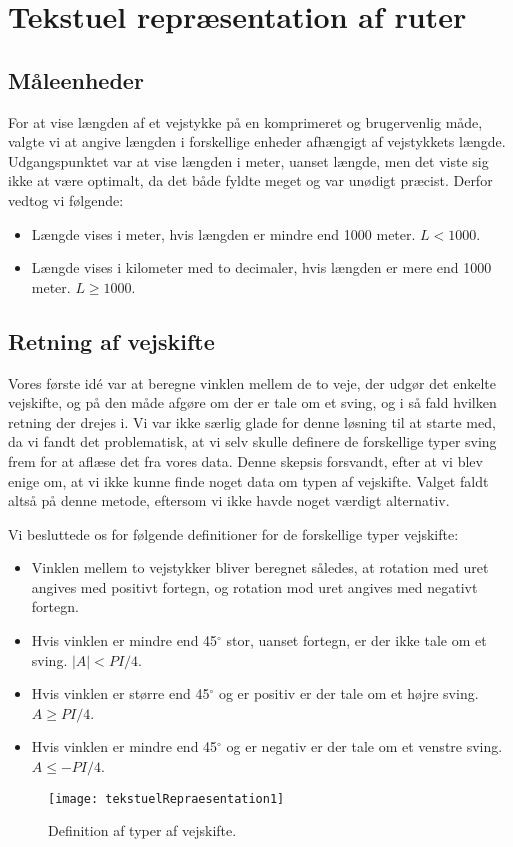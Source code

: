 \section{Tekstuel repræsentation af ruter}
\label{sec:tekstuelRepraesentation}

\subsection{Måleenheder}
\label{sec:maaleenheder}

For at vise længden af et vejstykke på en komprimeret og brugervenlig måde, valgte vi at angive længden i forskellige enheder afhængigt af vejstykkets længde. Udgangspunktet var at vise længden i meter, uanset længde, men det viste sig ikke at være optimalt, da det både fyldte meget og var unødigt præcist. Derfor vedtog vi følgende:

\begin{itemize}
	\item Længde vises i meter, hvis længden er mindre end 1000 meter. $L < 1000$.
	\item Længde vises i kilometer med to decimaler, hvis længden er mere end 1000 meter. $L \geq 1000$.
\end{itemize}

\subsection{Retning af vejskifte}
\label{sec:retning}

Vores første idé var at beregne vinklen mellem de to veje, der udgør det enkelte vejskifte, og på den måde afgøre om der er tale om et sving, og i så fald hvilken retning der drejes i. Vi var ikke særlig glade for denne løsning til at starte med, da vi fandt det problematisk, at vi selv skulle definere de forskellige typer sving frem for at aflæse det fra vores data. Denne skepsis forsvandt, efter at vi blev enige om, at vi ikke kunne finde noget data om typen af vejskifte. Valget faldt altså på denne metode, eftersom vi ikke havde noget værdigt alternativ.

Vi besluttede os for følgende definitioner for de forskellige typer vejskifte:

\begin{itemize}
	\item Vinklen mellem to vejstykker bliver beregnet således, at rotation med uret angives med positivt fortegn, og rotation mod uret angives med negativt fortegn.
	\item Hvis vinklen er mindre end 45$^{\circ}$ stor, uanset fortegn, er der ikke tale om et sving. $|A| < PI / 4$.
	\item Hvis vinklen er større end 45$^{\circ}$ og er positiv er der tale om et højre sving. $A \geq PI / 4$.
	\item Hvis vinklen er mindre end 45$^{\circ}$ og er negativ er der tale om et venstre sving. $A \leq -PI / 4$.
\end{itemize}

\begin{figure}[h]
	\centering
	\texttt{[image: tekstuelRepraesentation1]}
	\captionsetup{width=0.8\textwidth}
	\caption{Definition af typer af vejskifte.}
	\label{figur:tekstuelRepraesentation1}
\end{figure}